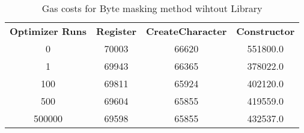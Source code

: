 \begin{table}[H]
	\centering
	\vspace*{-1ex}
	\scriptsize
	\vspace{-1ex}
	\label{gas_bytemasking}
    \begin{tabular}{|c|c|c|c|}
        \hline
        \textbf{Optimizer Runs} & \textbf{Register} & \textbf{CreateCharacter} &  \textbf{Constructor} \\
        0      &    70003 &           66620 &     551800.0 \\
        1      &    69943 &           66365 &     378022.0 \\
        100    &    69811 &           65924 &     402120.0 \\
        500    &    69604 &           65855 &     419559.0 \\
        500000 &    69598 &           65855 &     432537.0 \\
        \hline
    \end{tabular}
	\caption{Gas costs for Byte masking method wihtout Library}
\end{table}